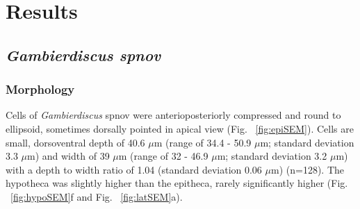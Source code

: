 \documentclass[12pt]{article}
\begin{document}
\newpage
\section{Results}

\subsection{\emph{Gambierdiscus spnov}}
\subsubsection{Morphology}
Cells of\textit{ Gambierdiscus }spnov were anterioposteriorly compressed and round to ellipsoid, sometimes dorsally pointed in apical view (Fig. ~\ref{fig:epiSEM}). Cells are small, dorsoventral depth of 40.6 $\mu$m (range of 34.4 - 50.9 $\mu$m; standard deviation 3.3 $\mu$m) and width of 39 $\mu$m (range of 32 - 46.9 $\mu$m; standard deviation 3.2 $\mu$m) with a depth to width ratio of 1.04 (standard deviation 0.06 $\mu$m) (n=128). The hypotheca was slightly higher than the epitheca, rarely significantly higher (Fig. ~\ref{fig:hypoSEM}f and Fig. ~\ref{fig:latSEM}a).
\end{document}
